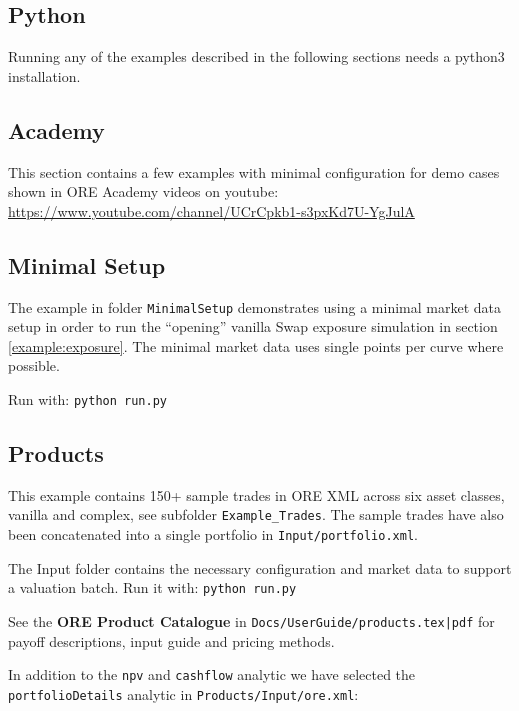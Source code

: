 \subsection*{Python}

Running any of the examples described in the following sections needs a python3 installation.

\subsection{Academy}\label{example:academy}

This section contains a few examples with minimal configuration for demo cases shown in ORE Academy videos
on youtube: \url{https://www.youtube.com/channel/UCrCpkb1-s3pxKd7U-YgJulA}

\subsection{Minimal Setup}\label{example:minimal}

The example in folder {\tt MinimalSetup} demonstrates using a minimal market data setup in order to run the ``opening''
vanilla Swap exposure simulation in section \ref{example:exposure}.
The minimal market data uses single points per curve where possible.

Run with: {\tt python run.py}

\subsection{Products}

This example contains 150+ sample trades in ORE XML across six asset classes, vanilla and complex, see subfolder {\tt Example\_Trades}.
The sample trades have also been concatenated into a single portfolio in {\tt Input/portfolio.xml}.

The Input folder contains the necessary configuration and market data to support a valuation batch. Run it with: {\tt python run.py}

See the {\bf ORE Product Catalogue} in {\tt Docs/UserGuide/products.tex|pdf} for payoff descriptions, input guide and pricing methods.

\medskip
In addition to the {\tt npv} and {\tt cashflow} analytic we have selected the {\tt portfolioDetails} analytic in {\tt Products/Input/ore.xml}:

